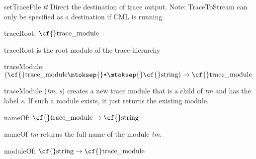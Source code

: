 \begin{descr}
\begin{speccomment}
\item {\cf \small set\-Trace\-File \mbox{\cf \small \textit{tt}}           } 
Direct the destination of trace output. 	  Note: {\cf \small Trace\-To\-Stream} can only be specified as a 	  destination if CML is running.     \end{speccomment}
\item {}{} {\cf traceRoot: \(\mbox{\cf{}trace\_module}\)}\label{val-TRACE_CML.traceRoot}


\begin{speccomment}
\item {\cf \small trace\-Root           } 
is the root module of the trace hierarchy     \end{speccomment}
\item {}{} {\cf traceModule: \((\mbox{\cf{}trace\_module}\mtoksep{}\verb,*,\mtoksep{}\mbox{\cf{}string})\rightarrow \mbox{\cf{}trace\_module}\)}\label{val-TRACE_CML.traceModule}


\begin{speccomment}
\item {\cf \small trace\-Module (\mbox{\cf \small \textit{tm}}, \mbox{\cf \small \textit{s}})           } 
creates a new trace module that is a child of \mbox{\cf \small \textit{tm}} and 	  has the label \mbox{\cf \small \textit{s}}. 	  If such a module exists, it just returns the existing module.     \end{speccomment}
\item {}{} {\cf nameOf: \(\mbox{\cf{}trace\_module}\rightarrow \mbox{\cf{}string}\)}\label{val-TRACE_CML.nameOf}


\begin{speccomment}
\item {\cf \small name\-Of \mbox{\cf \small \textit{tm}}           } 
returns the full name of the module \mbox{\cf \small \textit{tm}}.     \end{speccomment}
\item {}{} {\cf moduleOf: \(\mbox{\cf{}string}\rightarrow \mbox{\cf{}trace\_module}\)}\label{val-TRACE_CML.moduleOf}



\end{descr}
